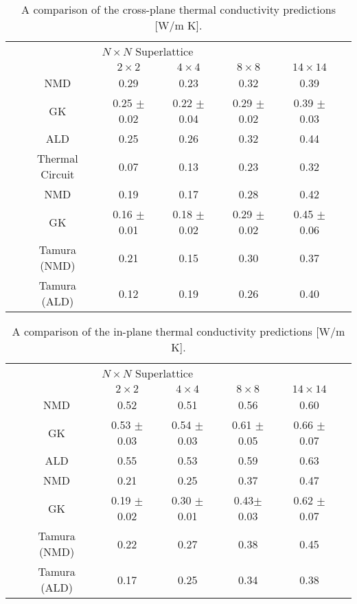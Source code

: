 \begin{table*}
\begin{center}
\begin{tabular*}{\textwidth}{c@{\extracolsep{\fill}}cccccc}
\hline\hline\noalign{\smallskip}
\multicolumn{2}{c}{\multirow{2}{*}{Cross-Plane}}& \multicolumn{4}{c}{$N\times N$ Superlattice} \\
\cline{3-6}\noalign{\smallskip}
\hspace{1cm} && $2\times2$ & $4\times4$ & $8\times8$ & $14\times14$  \\
\noalign{\smallskip}\hline\noalign{\smallskip}
\multirow{3}{*}{Perfect} &NMD & 0.29 & 0.23  & 0.32  & 0.39 \\
&GK & 0.25 $\pm$ 0.02 & 0.22 $\pm$ 0.04  &  0.29 $\pm$ 0.02  &  0.39 $\pm$ 0.03\\
&ALD & 0.25 &	0.26  &	0.32	 &0.44\\
&Thermal Circuit & 0.07  &  0.13  &  0.23  &  0.32\\
\noalign{\smallskip}\hline
\multirow{3}{*}{Mixed} &NMD &0.19 & 0.17 & 0.28 & 0.42\\
&GK  & 0.16 $\pm$ 0.01  &  0.18 $\pm$ 0.02 &  0.29 $\pm$ 0.02 &   0.45 $\pm$ 0.06\\
&Tamura (NMD) & 0.21 & 0.15 & 0.30 & 0.37\\
&Tamura (ALD) & 0.12 & 0.19 & 0.26 & 0.40\\
\hline\hline
\end{tabular*}
\end{center}
\renewcommand{\table}{Table.}
\caption{A comparison of the cross-plane thermal conductivity predictions [W/m K].}
\label{TB:K_CP}
\end{table*}

\begin{table*}
\begin{center}
\begin{tabular*}{\textwidth}{c@{\extracolsep{\fill}}cccccc}
\hline\hline\noalign{\smallskip}
\multicolumn{2}{c}{\multirow{2}{*}{In-Plane}}&\multicolumn{4}{c}{$N\times N$ Superlattice} \\
\cline{3-6}\noalign{\smallskip}
\hspace{1cm} && $2\times2$ & $4\times4$ & $8\times8$ & $14\times14$  \\
\noalign{\smallskip}\hline\noalign{\smallskip}
\multirow{2}{*}{Perfect} &NMD &0.52 & 0.51 & 0.56 & 0.60\\
&GK &0.53 $\pm$ 0.03 &  0.54 $\pm$ 0.03 &  0.61 $\pm$ 0.05  &  0.66 $\pm$ 0.07 \\
&ALD & 0.55	& 0.53	&	0.59 	&0.63\\
\noalign{\smallskip}\hline
\multirow{3}{*}{Mixed} & NMD &0.21 & 0.25 &	0.37 & 0.47\\
&GK & 0.19 $\pm$ 0.02 &  0.30 $\pm$ 0.01  & 0.43$\pm$ 0.03 &  0.62 $\pm$ 0.07 \\   
&Tamura (NMD)& 0.22 & 0.27 & 0.38 &0.45\\
&Tamura (ALD) & 0.17 & 0.25 & 0.34 &0.38\\
\hline\hline
\end{tabular*}
\end{center}
\renewcommand{\table}{Table.}
\caption{A comparison of the in-plane thermal conductivity predictions [W/m K].}
\label{TB:K_IP}
\end{table*}

